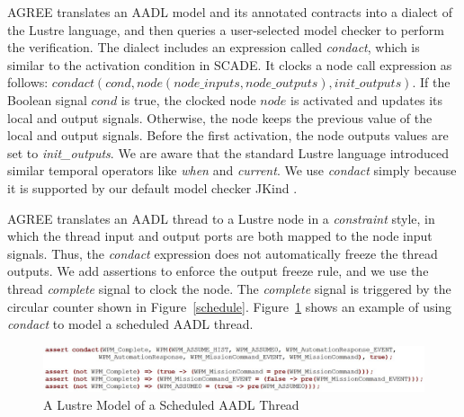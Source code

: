 AGREE translates an AADL model and its annotated contracts into a dialect \cite{jkind} of the Lustre language, and then queries a user-selected model checker to perform the verification. The dialect includes an expression called \emph{condact}, which is similar to the activation condition in SCADE. It clocks a node call expression as follows: 
$
condact (cond, node(node\_inputs, node\_outputs), init\_outputs)
$.
If the Boolean signal $cond$ is true, the clocked node $node$ is activated and updates its local and output signals. Otherwise, the node keeps the previous value of the local and output signals. Before the first activation, the node outputs values are set to \emph{init\_outputs}. %
We are aware that the standard Lustre language introduced similar temporal operators like \emph{when} and \emph{current}. We use \emph{condact} simply because it is supported by our default model checker JKind \cite{jkind}.

AGREE translates an AADL thread to a Lustre node in a \emph{constraint} style, in which the thread input and output ports are both mapped to the node input signals. Thus, the \emph{condact} expression does not automatically freeze the thread outputs. We add assertions to enforce the output freeze rule, and we use the thread \emph{complete} signal to clock the node. The \emph{complete} signal is triggered by the circular counter shown in Figure~\ref{schedule}. Figure~\ref{WPMlustre} shows an example of using \emph{condact} to model a scheduled AADL thread. 

\begin{figure}[ht!]
\centering
\includegraphics[width=120mm]{lustreAsync5.jpg}
\caption{A Lustre Model of a Scheduled AADL Thread \label{WPMlustre}}
\end{figure}

%
%

